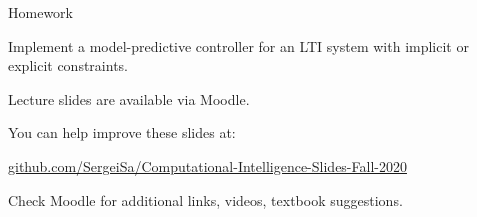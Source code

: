 \documentclass{beamer}
\begin{document}
\begin{frame}{Homework}
\begin{flushleft}

Implement a model-predictive controller for an LTI system with implicit or explicit constraints.

\end{flushleft}
\end{frame}



\begin{frame}
\centerline{Lecture slides are available via Moodle.}
\bigskip
\centerline{You can help improve these slides at:}

\centerline{\href{https://github.com/SergeiSa/Computational-Intelligence-Slides-Fall-2020}{github.com/SergeiSa/Computational-Intelligence-Slides-Fall-2020}}


\bigskip
\centerline{Check Moodle for additional links, videos, textbook suggestions.}
\end{frame}
\end{document}
